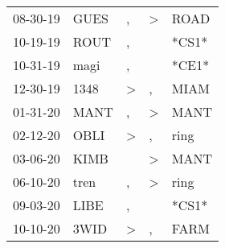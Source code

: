 \begin{supertabular}{p{0.07\textwidth}p{0.06\textwidth}p{0.02\textwidth}p{0.02\textwidth}p{0.06\textwidth}}
          08-30-19\textsuperscript{} &           GUES\textsuperscript{} &                , &     \textgreater &           ROAD\textsuperscript{} \\
          10-19-19\textsuperscript{} &           ROUT\textsuperscript{} &                , &                  &                            *CS1* \\
          10-31-19\textsuperscript{} &           magi\textsuperscript{} &                , &                  &                            *CE1* \\
          12-30-19\textsuperscript{} &           1348\textsuperscript{} &     \textgreater &                , &           MIAM\textsuperscript{} \\
          01-31-20\textsuperscript{} &           MANT\textsuperscript{} &                , &     \textgreater &           MANT\textsuperscript{} \\
          02-12-20\textsuperscript{} &           OBLI\textsuperscript{} &     \textgreater &                , &           ring\textsuperscript{} \\
          03-06-20\textsuperscript{} &           KIMB\textsuperscript{} &                  &     \textgreater &           MANT\textsuperscript{} \\
          06-10-20\textsuperscript{} &           tren\textsuperscript{} &                , &     \textgreater &           ring\textsuperscript{} \\
          09-03-20\textsuperscript{} &           LIBE\textsuperscript{} &                , &                  &                            *CS1* \\
          10-10-20\textsuperscript{} &           3WID\textsuperscript{} &     \textgreater &                , &           FARM\textsuperscript{} \\
\end{supertabular}
